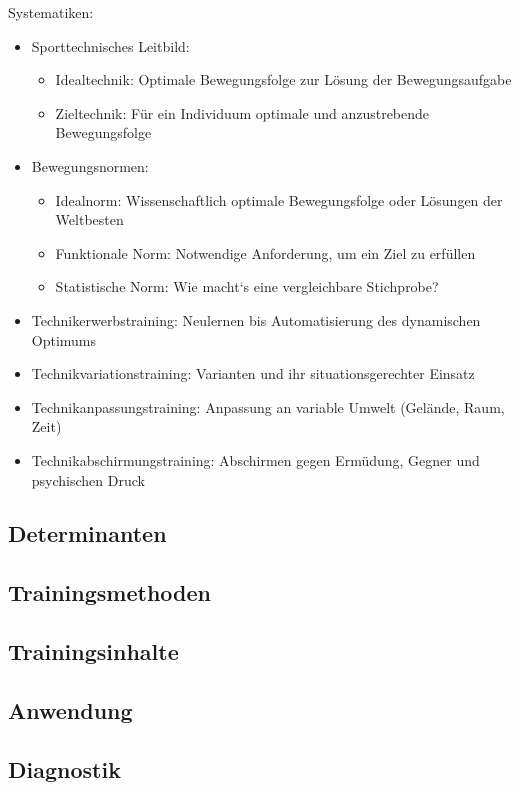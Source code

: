 Systematiken:
\begin{itemize}
    \item Sporttechnisches Leitbild:
    \begin{itemize}
        \item Idealtechnik: Optimale Bewegungsfolge zur Lösung der Bewegungsaufgabe
        \item Zieltechnik: Für ein Individuum optimale und anzustrebende Bewegungsfolge
    \end{itemize}
    \item Bewegungsnormen:
    \begin{itemize}
        \item Idealnorm: Wissenschaftlich optimale Bewegungsfolge oder Lösungen der Weltbesten
        \item Funktionale Norm: Notwendige Anforderung, um ein Ziel zu erfüllen
        \item Statistische Norm: Wie macht‘s eine vergleichbare Stichprobe?
    \end{itemize}
    \item Technikerwerbstraining: Neulernen bis Automatisierung des dynamischen Optimums
    \item Technikvariationstraining: Varianten und ihr situationsgerechter Einsatz
    \item Technikanpassungstraining: Anpassung an variable Umwelt (Gelände, Raum, Zeit)
    \item Technikabschirmungstraining: Abschirmen gegen  Ermüdung, Gegner und psychischen Druck
\end{itemize}

\subsection{Determinanten}



\subsection{Trainingsmethoden}

\subsection{Trainingsinhalte}

\subsection{Anwendung}

\subsection{Diagnostik}


